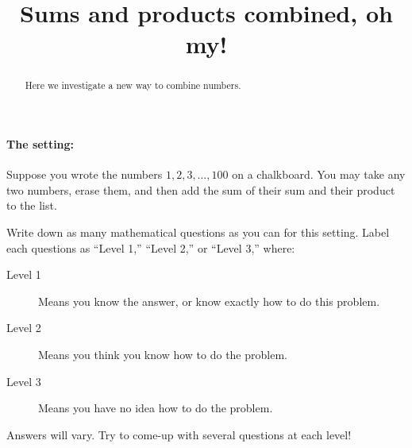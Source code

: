 \documentclass[handout,nooutcomes]{ximera}
\title[Activity:]{Sums and products combined, oh my!}
\begin{document}
\begin{abstract}
Here we investigate a new way to combine numbers.
\end{abstract}
\maketitle

\paragraph{The setting:}

Suppose you wrote the numbers $1,2,3,\dots,100$ on a chalkboard. You
may take any two numbers, erase them, and then add the sum of their
sum and their product to the list.

\begin{problem}
     Write down as many mathematical questions as you can for this
     setting. Label each questions as ``Level
     1,'' ``Level 2,'' or ``Level 3,'' where:
\begin{description}
\item[Level 1] Means you know the answer, or know exactly how to do
  this problem.
\item[Level 2] Means you think you know how to do the problem.
\item[Level 3] Means you have no idea how to do the problem.
\end{description}
\begin{freeResponse}
  Answers will vary. Try to come-up with several questions at each level!
\end{freeResponse}
\end{problem}




\end{document}
